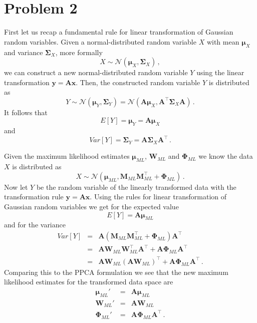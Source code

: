 \documentclass{scrartcl}
\begin{document}
\section{Problem 2} %
\label{sec:problem_2}
First let us recap a fundamental rule for linear transformation of Gaussian random variables. Given a normal-distributed random variable $X$ with mean $\bm{\mu}_X$ and variance $\bm{\Sigma}_X$, more formally
\begin{equation}
	X \sim \mathcal{N}(\bm{\mu}_X, \bm{\Sigma}_X) \, ,
\end{equation}
we can construct a new normal-distributed random variable $Y$ using the linear transformation $\mathbf{y} = \mathbf{A} \mathbf{x}$.
Then, the constructed random variable $Y$ is distributed as 
\begin{equation}
	Y \sim \mathcal{N}(\bm{\mu}_Y, \bm{\Sigma}_Y) = \mathcal{N}(\mathbf{A}\bm{\mu}_X, \mathbf{A}^\top \bm{\Sigma}_X \mathbf{A})\, .
\end{equation}
It follows that
\begin{equation}
	E\left[Y\right] = \bm{\mu}_Y = \mathbf{A}\bm{\mu}_X
\end{equation}
and
\begin{equation}
	Var\left[Y\right] = \bm{\Sigma}_Y = \mathbf{A} \bm{\Sigma}_X \mathbf{A}^\top \, .
\end{equation}


Given the maximum likelihood estimates $\bm{\mu}_{ML}$, $\bm{W}_{ML}$ and $\bm{\Phi}_{ML}$ we know the data $X$ is distributed as
\begin{equation}
	X \sim \mathcal{N}(\bm{\mu}_{ML}, \mathbf{M}_{ML}\mathbf{M}_{ML}^\top + \bm{\Phi}_{ML}) \, .
\end{equation}
Now let $Y$ be the random variable of the linearly transformed data with the transformation rule $\mathbf{y} = \mathbf{A}\mathbf{x}$.
Using the rules for linear transformation of Gaussian random variables we get for the expected value
\begin{equation}
	E\left[Y\right] = \mathbf{A}\bm{\mu}_{ML}
\end{equation}
and for the variance
\begin{eqnarray}
	Var\left[Y\right] &=& \mathbf{A} \left(\mathbf{M}_{ML}\mathbf{M}_{ML}^\top + \bm{\Phi}_{ML}\right)\mathbf{A}^\top\\
	&=& \mathbf{A} \mathbf{W}_{ML} \mathbf{W}_{ML}^\top \mathbf{A}^\top + \mathbf{A} \bm{\Phi}_{ML} \mathbf{A}^\top\\
	&=& \mathbf{A}\mathbf{W}_{ML}\left(\mathbf{A}\mathbf{W}_{ML}\right)^\top + \mathbf{A} \bm{\Phi}_{ML} \mathbf{A}^\top \, .
\end{eqnarray}
Comparing this to the PPCA formulation we see that the new maximum likelihood estimates for the transformed data space are
\begin{eqnarray}
	\bm{\mu}_{ML}' &=& \mathbf{A} \bm{\mu}_{ML}\\
	\bm{W}_{ML}' &=& \mathbf{A} \bm{W}_{ML}\\
	\bm{\Phi}_{ML}' &=& \mathbf{A} \bm{\Phi}_{ML} \mathbf{A}^\top \, .
\end{eqnarray}
\end{document}
